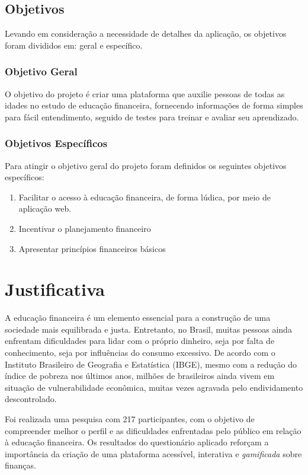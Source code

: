 \documentclass[
	article,			%
	12pt,				%
	oneside,			%
	a4paper,			%
	english,			%
	brazil,				%
	sumario=tradicional
	]{abntex2}
\begin{document}
    

\subsection{Objetivos}
    Levando em consideração a necessidade de detalhes da aplicação, os objetivos foram divididos em: geral e específico.
\subsubsection{Objetivo Geral}
    O objetivo do projeto é criar uma plataforma que auxilie pessoas de todas as idades no estudo de educação financeira, fornecendo informações de forma simples para fácil entendimento, seguido de testes para treinar e avaliar seu aprendizado.
\subsubsection{Objetivos Específicos}
    Para atingir o objetivo geral do projeto foram definidos os seguintes objetivos específicos:
        \begin{enumerate}[label=\alph*)]
            \item Facilitar o acesso à educação financeira, de forma lúdica, por meio de aplicação web.
            \item Incentivar o planejamento financeiro
            \item Apresentar princípios financeiros básicos 
        \end{enumerate}





    
    
       
\section{Justificativa}    
    A educação financeira é um elemento essencial para a construção de uma sociedade mais equilibrada e justa. Entretanto, no Brasil, muitas pessoas ainda enfrentam dificuldades para lidar com o próprio dinheiro, seja por falta de conhecimento, seja por influências do consumo excessivo. De acordo com o Instituto Brasileiro de Geografia e Estatística (IBGE), mesmo com a redução do índice de pobreza nos últimos anos, milhões de brasileiros ainda vivem em situação de vulnerabilidade econômica, muitas vezes agravada pelo endividamento descontrolado.

    Foi realizada uma pesquisa com 217 participantes, com o objetivo de compreender melhor o perfil e as dificuldades enfrentadas pelo público em relação à educação financeira. Os resultados do questionário aplicado reforçam a importância da criação de uma plataforma acessível, interativa e \textit{gamificada} sobre finanças.
\end{document}
